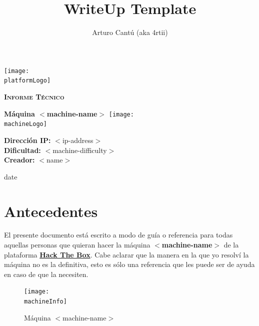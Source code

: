 \documentclass[a4paper]{article} %
\title{WriteUp Template}
\author{Arturo Cantú (aka 4rtii)}
\newcommand{\platformLogo}{img/HTB-Logo.png}        %
\newcommand{\platformURL}{https://hackthebox.com}   %
\newcommand{\machineName}{$<$machine-name$>$}              %
\newcommand{\machineLogo}{img/preignitionLogo.png}  %
\newcommand{\machineInfo}{img/preignitionInfo.png}  %
\newcommand{\machineIP}{$<$ip-address$>$}                %
\newcommand{\machineDiff}{$<$machine-difficulty$>$}                %
\newcommand{\startDate}{date}           %
\begin{document}
    \fancyfoot[R]{\thepage}     %
    \begin{titlepage}
        \centering
        \texttt{[image: \\platformLogo]}\par\vspace{1cm} %
        {\scshape\LARGE\textbf{Informe Técnico}\par}
        \vspace{0.3cm}
        {\Huge\bfseries\textcolor{greenCover}{Máquina \machineName}}
        \vfill\vfill
        \texttt{[image: \\machineLogo]}\par\vspace{1cm} %
        \vfill
        \begin{tcolorbox}[colback=red!5!white,colframe=red!75!black]    %
            \centering
            \textbf{Dirección IP:} \machineIP\\\textbf{Dificultad:} \machineDiff\\\textbf{Creador:} $<$name$>$
        \end{tcolorbox}
        \vfill
        {\large \startDate\par}
        \vfill
    \end{titlepage}
    
    \clearpage          %
    \tableofcontents    %
    \clearpage          %
    
    \section{Antecedentes}
        El presente documento está escrito a modo de guía o referencia para todas aquellas personas que quieran hacer la máquina \textbf{\machineName} de la plataforma \href{\platformURL}{\textbf{Hack The Box}}. Cabe aclarar que la manera en la que yo resolví la máquina no es la definitiva, esto es sólo una referencia que les puede ser de ayuda en caso de que la necesiten.
        
        \vspace{0.2cm}
        
        \begin{figure}[h]
            \centering
            \texttt{[image: \\machineInfo]}     %
            \caption{Máquina {\machineName}}
            \label{fig:preignition}
        \end{figure}
        
\end{document}
